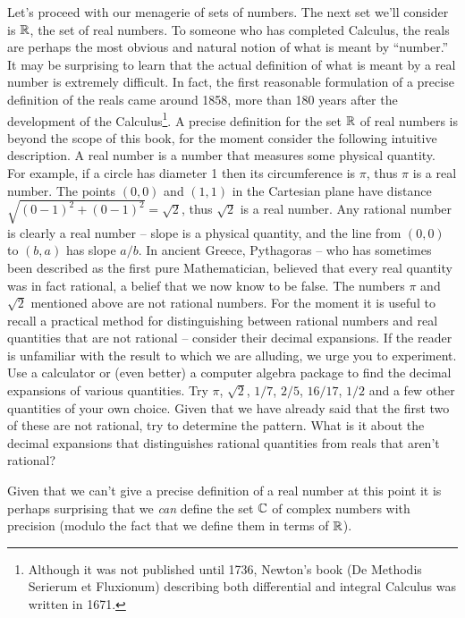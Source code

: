 Let's proceed with our menagerie of sets of numbers.  The next set
we'll consider is ${\mathbb R}$, the set of real numbers.  To someone
who has completed Calculus, the reals are perhaps the most obvious and
natural notion of what is meant by ``number.''  It may be surprising to
learn that the actual definition of what is meant by a real number is
extremely difficult.  In fact, the first reasonable formulation of a
precise definition of the reals came around 1858, more than 180 years
after the development of the 
Calculus\footnote{Although it was not
  published until 1736, Newton's book (De Methodis Serierum et
  Fluxionum) describing both differential and integral Calculus was
  written in 1671.}.  A precise 
definition for the set ${\mathbb R}$ of real numbers is 
beyond the scope of this book, for the moment consider the
following intuitive description.  A real number is a number that 
measures some physical quantity.  For example, if a circle has
diameter 1 then its circumference is $\pi$, thus $\pi$ is a real
number. The points $(0,0)$ and $(1,1)$ in the Cartesian plane have
distance $\sqrt{ (0-1)^2 + (0-1)^2} = \sqrt{2}$, thus $\sqrt{2}$ is 
a real number.  Any rational number is clearly a real number -- slope
is a physical quantity, and the line from $(0,0)$ to $(b,a)$ has slope
$a/b$.  In ancient Greece, Pythagoras -- who has sometimes been
described as the first pure Mathematician, believed that 
every real quantity was in fact rational, a belief that we now know to
be false.  The numbers $\pi$ and $\sqrt{2}$ mentioned above are not
rational numbers.  For the moment it is useful to recall a practical
method for distinguishing between rational numbers and real quantities
that are not rational -- consider their decimal expansions.  If the
reader is unfamiliar with the result to which we are alluding, we urge
you to experiment.  Use a calculator or (even better) a computer
algebra package to find the decimal expansions of various quantities.
Try $\pi$, $\sqrt{2}$, $1/7$, $2/5$, $16/17$, $1/2$ and a few other
quantities of your own choice.  Given that we have already said that the first
two of these are not rational, try to determine the pattern.  What is 
it about the decimal expansions
that distinguishes rational quantities from reals that aren't rational?

Given that we can't give a precise definition of a real number at this
point it is perhaps surprising that we {\em can} define the set
${\mathbb C}$ of complex numbers with precision 
(modulo the fact that we define them in terms of ${\mathbb R}$).  

